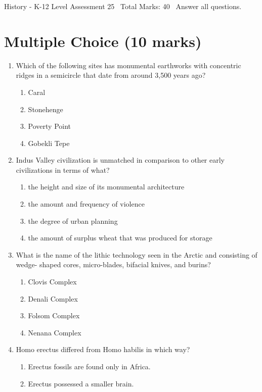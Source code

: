 \documentclass[12pt]{article}
\begin{document}
\begin{center}
History - K-12 Level Assessment 25 \
Total Marks: 40 \
Answer all questions.
\end{center}

\section*{Multiple Choice (10 marks)}
\begin{enumerate}[label=\arabic*.]
\item Which of the following sites has monumental earthworks with concentric ridges in a semicircle that date from around 3,500 years ago?
\begin{enumerate}[label=(\alph*)]
    \item Caral
    \item Stonehenge
    \item Poverty Point
    \item Gobekli Tepe
\end{enumerate}
\item Indus Valley civilization is unmatched in comparison to other early civilizations in terms of what?
\begin{enumerate}[label=(\alph*)]
    \item the height and size of its monumental architecture
    \item the amount and frequency of violence
    \item the degree of urban planning
    \item the amount of surplus wheat that was produced for storage
\end{enumerate}
\item What is the name of the lithic technology seen in the Arctic and consisting of wedge- shaped cores, micro-blades, bifacial knives, and burins?
\begin{enumerate}[label=(\alph*)]
    \item Clovis Complex
    \item Denali Complex
    \item Folsom Complex
    \item Nenana Complex
\end{enumerate}
\item Homo erectus differed from Homo habilis in which way?
\begin{enumerate}[label=(\alph*)]
    \item Erectus fossils are found only in Africa.
    \item Erectus possessed a smaller brain.

\end{enumerate}
\end{enumerate}
\end{document}
